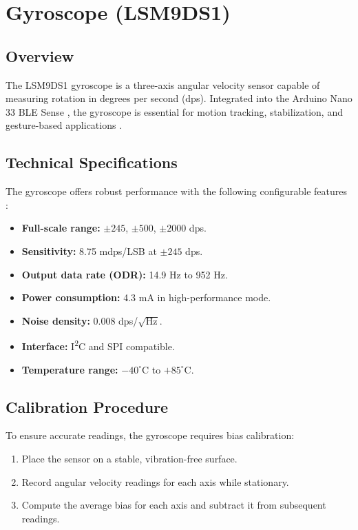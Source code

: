 \section{Gyroscope (LSM9DS1)}

\subsection{Overview}
The LSM9DS1 gyroscope is a three-axis angular velocity sensor capable of measuring rotation in degrees per second (dps). Integrated into the Arduino Nano 33 BLE Sense , the gyroscope is essential for motion tracking, stabilization, and gesture-based applications \cite{Bosch:2024b, STM:2015}.

\subsection{Technical Specifications}
The gyroscope offers robust performance with the following configurable features \cite{STM:2015}:
\begin{itemize}
    \item \textbf{Full-scale range:} $\pm245$, $\pm500$, $\pm2000$ dps.
    \item \textbf{Sensitivity:} 8.75 mdps/LSB at $\pm245$ dps.
    \item \textbf{Output data rate (ODR):} 14.9 Hz to 952 Hz.
    \item \textbf{Power consumption:} 4.3 mA in high-performance mode.
    \item \textbf{Noise density:} 0.008 dps/$\sqrt{\text{Hz}}$.
    \item \textbf{Interface:} I\textsuperscript{2}C and SPI compatible.
    \item \textbf{Temperature range:} $-40^{\circ}$C to $+85^{\circ}$C.
\end{itemize}

\subsection{Calibration Procedure}
To ensure accurate readings, the gyroscope requires bias calibration:
\begin{enumerate}
    \item Place the sensor on a stable, vibration-free surface.
    \item Record angular velocity readings for each axis while stationary.
    \item Compute the average bias for each axis and subtract it from subsequent readings.
\end{enumerate}

